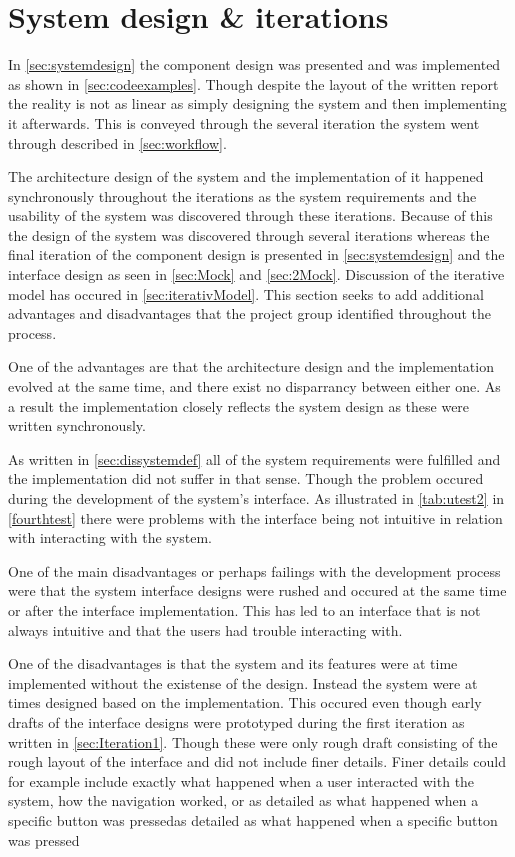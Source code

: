 \section{System design \& iterations}\label{sec:dissystemdes}

In \cref{sec:systemdesign} the component design was presented and was implemented as shown in \cref{sec:codeexamples}.
Though despite the layout of the written report the reality is not as linear as simply designing the system and then implementing it afterwards.
This is conveyed through the several iteration the system went through described in \cref{sec:workflow}.

The architecture design of the system and the implementation of it happened synchronously throughout the iterations as the system requirements and the usability of the system was discovered through these iterations.
Because of this the design of the system was discovered through several iterations whereas the final iteration of the component design is presented in \cref{sec:systemdesign} and the interface design as seen in \cref{sec:Mock} and \ref{sec:2Mock}.
Discussion of the iterative model has occured in \cref{sec:iterativModel}.
This section seeks to add additional advantages and disadvantages that the project group identified throughout the process.

One of the advantages are that the architecture design and the implementation evolved at the same time, and there exist no disparrancy between either one.
As a result the implementation closely reflects the system design as these were written synchronously.

As written in \cref{sec:dissystemdef} all of the system requirements were fulfilled and the implementation did not suffer in that sense.
Though the problem occured during the development of the system's interface.
As illustrated in \cref{tab:utest2} in \cref{fourthtest} there were problems with the interface being not intuitive in relation with interacting with the system. 

One of the main disadvantages or perhaps failings with the development process were that the system interface designs were rushed and occured at the same time or after the interface implementation.
This has led to an interface that is not always intuitive and that the users had trouble interacting with.

One of the disadvantages is that the system and its features were at time implemented without the existense of the design.
Instead the system were at times designed based on the implementation.
This occured even though early drafts of the interface designs were prototyped during the first iteration as written in \cref{sec:Iteration1}.
Though these were only rough draft consisting of the rough layout of the interface and did not include finer details.
Finer details could for example include exactly what happened when a user interacted with the system, how the navigation worked, or as detailed as what happened when a specific button was pressedas detailed as what happened when a specific button was pressed

